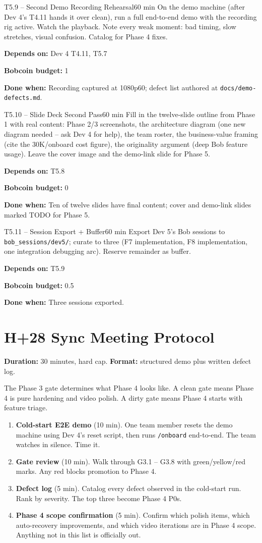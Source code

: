 \documentclass[11pt,letterpaper]{article}
\newcommand{\acceptance}[1]{\par\smallskip\textcolor{ibmgreen}{\textbf{Done when:}} #1}
\newcommand{\depends}[1]{\par\smallskip\textcolor{ibmorange}{\textbf{Depends on:}} #1}
\newcommand{\bobcost}[1]{\par\smallskip\textcolor{ibmaccent}{\textbf{Bobcoin budget:}} #1}
\begin{document}
\begin{task}{T5.9 -- Second Demo Recording Rehearsal}{60 min}
On the demo machine (after Dev 4's T4.11 hands it over clean), run a full end-to-end demo with the recording rig active. Watch the playback. Note every weak moment: bad timing, slow stretches, visual confusion. Catalog for Phase 4 fixes.
\depends{Dev 4 T4.11, T5.7}
\bobcost{1}
\acceptance{Recording captured at 1080p60; defect list authored at \texttt{docs/demo-defects.md}.}
\end{task}

\begin{task}{T5.10 -- Slide Deck Second Pass}{60 min}
Fill in the twelve-slide outline from Phase 1 with real content: Phase 2/3 screenshots, the architecture diagram (one new diagram needed -- ask Dev 4 for help), the team roster, the business-value framing (cite the 30K/onboard cost figure), the originality argument (deep Bob feature usage). Leave the cover image and the demo-link slide for Phase 5.
\depends{T5.8}
\bobcost{0}
\acceptance{Ten of twelve slides have final content; cover and demo-link slides marked TODO for Phase 5.}
\end{task}

\begin{task}{T5.11 -- Session Export + Buffer}{60 min}
Export Dev 5's Bob sessions to \texttt{bob\_sessions/dev5/}; curate to three (F7 implementation, F8 implementation, one integration debugging arc). Reserve remainder as buffer.
\depends{T5.9}
\bobcost{0.5}
\acceptance{Three sessions exported.}
\end{task}

\section{H+28 Sync Meeting Protocol}

\textbf{Duration:} 30 minutes, hard cap. \textbf{Format:} structured demo plus written defect log.

The Phase 3 gate determines what Phase 4 looks like. A clean gate means Phase 4 is pure hardening and video polish. A dirty gate means Phase 4 starts with feature triage.

\begin{enumerate}
  \item \textbf{Cold-start E2E demo} (10 min). One team member resets the demo machine using Dev 4's reset script, then runs \texttt{/onboard} end-to-end. The team watches in silence. Time it.
  \item \textbf{Gate review} (10 min). Walk through G3.1 -- G3.8 with green/yellow/red marks. Any red blocks promotion to Phase 4.
  \item \textbf{Defect log} (5 min). Catalog every defect observed in the cold-start run. Rank by severity. The top three become Phase 4 P0s.
  \item \textbf{Phase 4 scope confirmation} (5 min). Confirm which polish items, which auto-recovery improvements, and which video iterations are in Phase 4 scope. Anything not in this list is officially out.
\end{enumerate}
\end{document}

